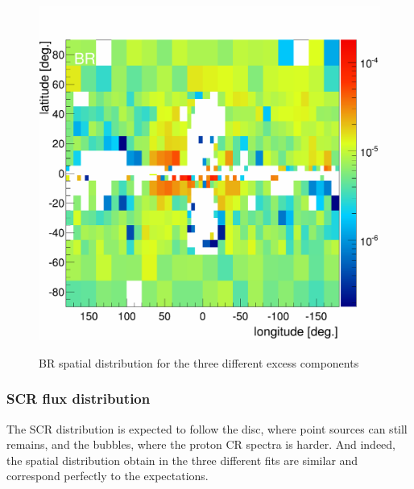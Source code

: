 \begin{figure}[h]
\begin{minipage}[h]{0.3\textwidth}
	  \label{}
  \end{minipage}
  \hfill
  \begin{minipage}[h]{0.3\textwidth}
	  \centering
	  \includegraphics[width=1.\linewidth]{pic/discussion/MSPonly_BR_integral_flux.png}
	  \label{}
  \end{minipage}
  \caption{BR spatial distribution for the three different excess components}
  \label{fig:BR_flux_distrib_excess_comp}	 
\end{figure}

\subsubsection{SCR flux distribution}
The SCR distribution is expected to follow the disc, where point sources can still remains, and the bubbles, where the proton CR spectra is harder. And indeed, the spatial distribution obtain in the three  different fits are similar and correspond perfectly to the expectations.



